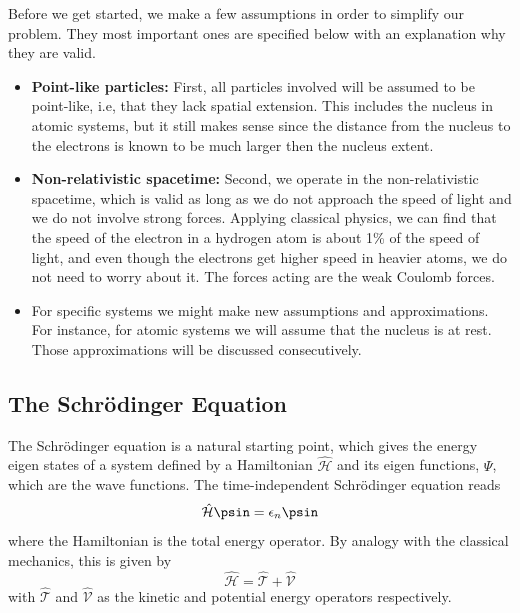 Before we get started, we make a few assumptions in order to simplify our problem. They most important ones are specified below with an explanation why they are valid.

\begin{itemize}
	\item \textbf{Point-like particles:} First, all particles involved will be assumed to be point-like, i.e, that they lack spatial extension. This includes the nucleus in atomic systems, but it still makes sense since the distance from the nucleus to the electrons is known to be much larger then the nucleus extent.
	
	\item \textbf{Non-relativistic spacetime:}  Second, we operate in the non-relativistic spacetime, which is valid as long as we do not approach the speed of light and we do not involve strong forces. Applying classical physics, we can find that the speed of the electron in a hydrogen atom is about 1\% of the speed of light, and even though the electrons get higher speed in heavier atoms, we do not need to worry about it. The forces acting are the weak Coulomb forces.
	
	\item For specific systems we might make new assumptions and approximations. For instance, for atomic systems we will assume that the nucleus is at rest. Those approximations will be discussed consecutively. 
\end{itemize}

\subsection{The Schrödinger Equation} \label{subsec:schrodinger}
The Schrödinger equation is a natural starting point, which gives the energy eigen states of a system defined by a Hamiltonian $\hat{\mathcal{H}}$ and its eigen functions, $\Psi$, which are the wave functions. The time-independent Schrödinger equation reads
\begin{equation}
\label{eq:Energy}
 \hat{\mathcal{H}}\psin=\epsilon_n\psin
\end{equation}
where the Hamiltonian is the total energy operator. By analogy with the classical mechanics, this is given by
\begin{equation}
\hat{\mathcal{H}}=\hat{\mathcal{T}}+\hat{\mathcal{V}}
\end{equation}
with $\hat{\mathcal{T}}$ and $\hat{\mathcal{V}}$ as the kinetic and potential energy operators respectively. 

